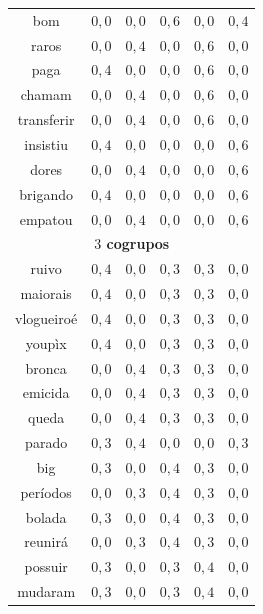 \documentclass[
    12pt,                %
    oneside,            %
    a4paper,            %
    english,            %
    brazil                %
    ]{abntex2ppgsi}
\begin{document}
\begin{table}[H]
{\begin{tabular}{cccccc}
            bom            & $0,0$ & $0,0$ & $0,6$ & $0,0$ & $0,4$ \\
            raros          & $0,0$ & $0,4$ & $0,0$ & $0,6$ & $0,0$ \\
            paga           & $0,4$ & $0,0$ & $0,0$ & $0,6$ & $0,0$ \\
            chamam         & $0,0$ & $0,4$ & $0,0$ & $0,6$ & $0,0$ \\
            transferir     & $0,0$ & $0,4$ & $0,0$ & $0,6$ & $0,0$ \\
            insistiu       & $0,4$ & $0,0$ & $0,0$ & $0,0$ & $0,6$ \\
            dores          & $0,0$ & $0,4$ & $0,0$ & $0,0$ & $0,6$ \\
            brigando       & $0,4$ & $0,0$ & $0,0$ & $0,0$ & $0,6$ \\
            empatou        & $0,0$ & $0,4$ & $0,0$ & $0,0$ & $0,6$ \\
            \hline
            \multicolumn{6}{c}{\textbf{$3$ cogrupos}} \\
            \hline
            ruivo          & $0,4$ & $0,0$ & $0,3$ & $0,3$ & $0,0$ \\
            maiorais       & $0,4$ & $0,0$ & $0,3$ & $0,3$ & $0,0$ \\
            vlogueiroé     & $0,4$ & $0,0$ & $0,3$ & $0,3$ & $0,0$ \\
            youpìx         & $0,4$ & $0,0$ & $0,3$ & $0,3$ & $0,0$ \\
            bronca         & $0,0$ & $0,4$ & $0,3$ & $0,3$ & $0,0$ \\
            emicida        & $0,0$ & $0,4$ & $0,3$ & $0,3$ & $0,0$ \\
            queda          & $0,0$ & $0,4$ & $0,3$ & $0,3$ & $0,0$ \\
            parado         & $0,3$ & $0,4$ & $0,0$ & $0,0$ & $0,3$ \\
            big            & $0,3$ & $0,0$ & $0,4$ & $0,3$ & $0,0$ \\
            períodos       & $0,0$ & $0,3$ & $0,4$ & $0,3$ & $0,0$ \\
            bolada         & $0,3$ & $0,0$ & $0,4$ & $0,3$ & $0,0$ \\
            reunirá        & $0,0$ & $0,3$ & $0,4$ & $0,3$ & $0,0$ \\
            possuir        & $0,3$ & $0,0$ & $0,3$ & $0,4$ & $0,0$ \\
            mudaram        & $0,3$ & $0,0$ & $0,3$ & $0,4$ & $0,0$ \\

\end{tabular}}
\end{table}
\end{document}

